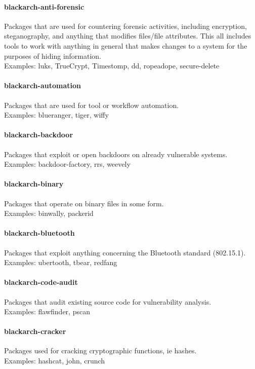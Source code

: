 \documentclass[a4paper, oneside,12pt]{scrartcl}
\begin{document}
\paragraph{blackarch-anti-forensic}
Packages that are used for countering forensic activities,
including encryption, steganography, and anything that modifies files/file attributes.
This all includes tools to work with anything in general that makes changes to a system
for the purposes of hiding information.
\\
Examples: luks, TrueCrypt, Timestomp, dd, ropeadope, secure-delete

\paragraph{blackarch-automation}
Packages that are used for tool or workflow automation.
\\
Examples: blueranger, tiger, wiffy

\paragraph{blackarch-backdoor}
Packages that exploit or open backdoors on already vulnerable systems.
\\
Examples: backdoor-factory, rrs, weevely

\paragraph{blackarch-binary}
Packages that operate on binary files in some form.
\\
Examples: binwally, packerid

\paragraph{blackarch-bluetooth}
Packages that exploit anything concerning the Bluetooth standard (802.15.1).
\\
Examples: ubertooth, tbear, redfang

\paragraph{blackarch-code-audit}
Packages that audit existing source code for vulnerability analysis.
\\
Examples: flawfinder, pscan

\paragraph{blackarch-cracker}
Packages used for cracking cryptographic functions, ie hashes.
\\
Examples: hashcat, john, crunch
\end{document}
